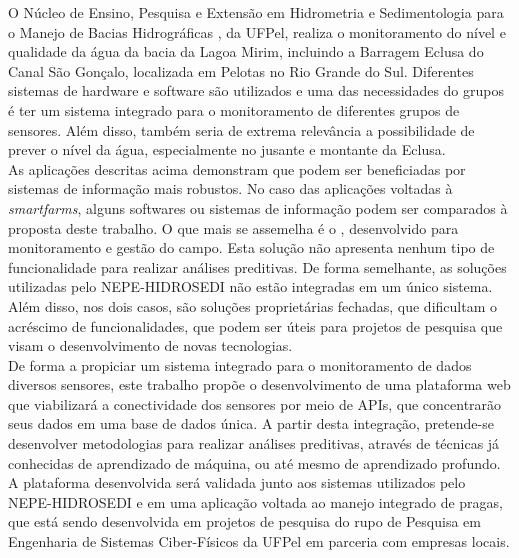 \documentclass[tcc-proposta]{texufpel}
\begin{document}
O Núcleo de Ensino, Pesquisa e Extensão em Hidrometria e Sedimentologia para o Manejo de Bacias Hidrográficas \citet{hidrosedi:2022}, da UFPel, realiza o monitoramento do nível e qualidade da água da bacia da Lagoa Mirim, incluindo a Barragem Eclusa do Canal São Gonçalo, localizada em Pelotas no Rio Grande do Sul. Diferentes sistemas de hardware e software são utilizados e uma das necessidades do grupos é ter um sistema integrado para o monitoramento de diferentes grupos de sensores. Além disso, também seria de extrema relevância a possibilidade de prever o nível da água, especialmente no jusante e montante da Eclusa.
\\

As aplicações descritas acima demonstram que podem ser beneficiadas por sistemas de informação mais robustos. No caso das aplicações voltadas à \textit{smartfarms}, alguns softwares ou sistemas de informação podem ser comparados à proposta deste trabalho. O que mais se assemelha é o \citet{farmbox:2022}, desenvolvido para monitoramento e gestão do campo. Esta solução não apresenta nenhum tipo de funcionalidade para realizar análises preditivas. De forma semelhante, as soluções utilizadas pelo NEPE-HIDROSEDI não estão integradas em um único sistema. Além disso, nos dois casos, são soluções proprietárias fechadas, que dificultam o acréscimo de funcionalidades, que podem ser úteis para projetos de pesquisa que visam o desenvolvimento de novas tecnologias.
\\

De forma a propiciar um sistema integrado para o monitoramento de dados diversos sensores, este trabalho propõe o desenvolvimento de uma plataforma web que viabilizará a conectividade dos sensores por meio de APIs, que concentrarão seus dados em uma base de dados única. A partir desta integração, pretende-se desenvolver metodologias para realizar análises preditivas, através de técnicas já conhecidas de aprendizado de máquina, ou até mesmo de aprendizado profundo. A plataforma desenvolvida será validada junto aos sistemas utilizados pelo NEPE-HIDROSEDI e em uma aplicação voltada ao manejo integrado de pragas, que está sendo desenvolvida em projetos de pesquisa do rupo de Pesquisa em Engenharia de Sistemas Ciber-Físicos da UFPel em parceria com empresas locais.  
\end{document}

